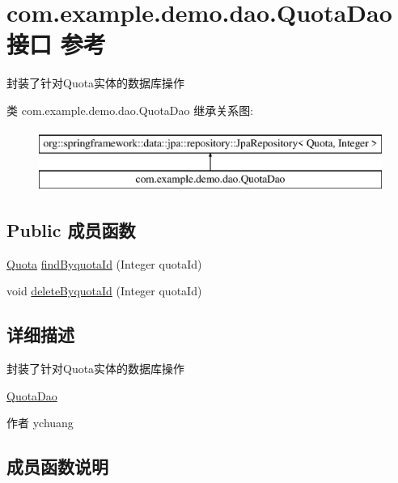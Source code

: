 \hypertarget{interfacecom_1_1example_1_1demo_1_1dao_1_1_quota_dao}{}\section{com.\+example.\+demo.\+dao.\+Quota\+Dao接口 参考}
\label{interfacecom_1_1example_1_1demo_1_1dao_1_1_quota_dao}


封装了针对\+Quota实体的数据库操作  


类 com.\+example.\+demo.\+dao.\+Quota\+Dao 继承关系图\+:\begin{figure}[H]
\begin{center}
\leavevmode
\includegraphics[height=2.000000cm]{interfacecom_1_1example_1_1demo_1_1dao_1_1_quota_dao}
\end{center}
\end{figure}
\subsection*{Public 成员函数}
\begin{DoxyCompactItemize}
\item 
\mbox{\hyperlink{classcom_1_1example_1_1demo_1_1modular_1_1_quota}{Quota}} \mbox{\hyperlink{interfacecom_1_1example_1_1demo_1_1dao_1_1_quota_dao_a5ad72cc401a19f3f40dcb585065764c1}{find\+Byquota\+Id}} (Integer quota\+Id)
\item 
void \mbox{\hyperlink{interfacecom_1_1example_1_1demo_1_1dao_1_1_quota_dao_a1a45d384920f803fb97edc9a70658a43}{delete\+Byquota\+Id}} (Integer quota\+Id)
\end{DoxyCompactItemize}


\subsection{详细描述}
封装了针对\+Quota实体的数据库操作 

\mbox{\hyperlink{interfacecom_1_1example_1_1demo_1_1dao_1_1_quota_dao}{Quota\+Dao}} \begin{DoxyAuthor}{作者}
ychuang 
\end{DoxyAuthor}


\subsection{成员函数说明}
\mbox{\label{interfacecom_1_1example_1_1demo_1_1dao_1_1_quota_dao_a1a45d384920f803fb97edc9a70658a43}} 
